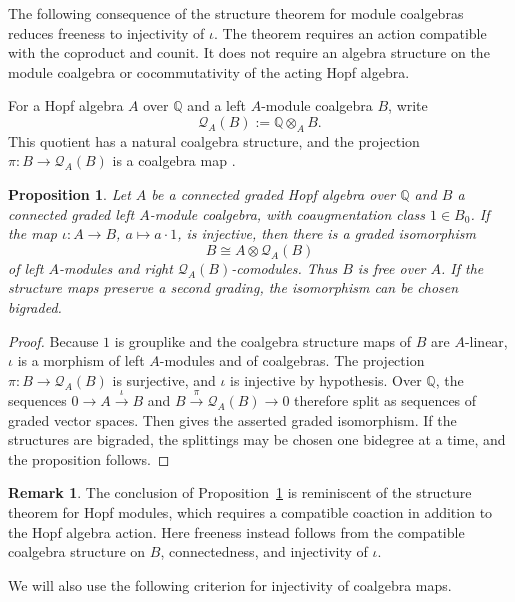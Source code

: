 \documentclass[12 pt]{amsart}
\newcommand{\QQ}{\mathbb{Q}}
\newcommand{\cQ}{\mathcal{Q}}
\newcommand{\<}{\langle}
\renewcommand{\>}{\rangle}
\newtheorem{proposition}[theorem]{Proposition}
\theoremstyle{definition}
\newtheorem{remark}[theorem]{Remark}
\begin{document}
The following consequence of the structure theorem for module coalgebras \cite[Theorem~4.4]{MilnorMoore} reduces freeness to injectivity of $\iota$. The theorem requires an action compatible with the coproduct and counit. It does not require an algebra structure on the module coalgebra or cocommutativity of the acting Hopf algebra. 

For a Hopf algebra $A$ over $\QQ$ and a left $A$-module coalgebra $B$, write $$\cQ_A(B) := \QQ \otimes_A B.$$ This quotient has a natural coalgebra structure, and the projection $\pi \colon B \to \cQ_A(B)$ is a coalgebra map \cite[Proposition~4.3]{MilnorMoore}.

\begin{proposition}\label{prop:MM-freeness}
Let $A$ be a connected graded Hopf algebra over $\QQ$ and $B$ a connected graded left $A$-module coalgebra, with coaugmentation class $1 \in B_0$. If the map ${\iota \colon A \to B}$, $a \mapsto a \cdot 1$, is injective, then there is a graded isomorphism
\[
B \cong A \otimes \cQ_A(B)
\]
of left $A$-modules and right $\cQ_A(B)$-comodules. Thus $B$ is free over $A$. If the structure maps preserve a second grading, the isomorphism can be chosen bigraded.
\end{proposition}

\begin{proof}
Because $1$ is grouplike and the coalgebra structure maps of $B$ are $A$-linear, $\iota$ is a morphism of left $A$-modules and of coalgebras. The projection $\pi \colon B \to \cQ_A(B)$ is surjective, and $\iota$ is injective by hypothesis. Over $\QQ$, the sequences $0 \to A \xrightarrow{\iota} B$ and $B \xrightarrow{\pi} \cQ_A(B) \to 0$ therefore split as sequences of graded vector spaces. Then \cite[Theorem~4.4]{MilnorMoore} gives the asserted graded isomorphism. If the structures are bigraded, the splittings may be chosen one bidegree at a time, and the proposition follows.
\end{proof}

\begin{remark}
The conclusion of Proposition~\ref{prop:MM-freeness} is reminiscent of the structure theorem for Hopf modules, which requires a compatible coaction in addition to the Hopf algebra action. Here freeness instead follows from the compatible coalgebra structure on $B$, connectedness, and injectivity of $\iota$.
\end{remark}

We will also use the following criterion for injectivity of coalgebra maps.
\end{document}
